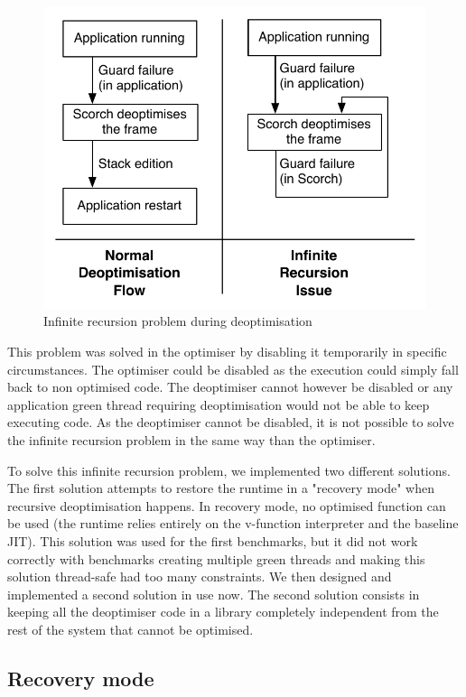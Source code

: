 \documentclass[a4paper,12pt,twoside]{../includes/ThesisStyle}
\begin{document}
\begin{figure}[h!]
    \begin{center}
        \includegraphics[width=0.65\linewidth]{InfiniteRecursionDeoptPb}
        \caption{Infinite recursion problem during deoptimisation}
        \label{fig:InfiniteRecursionDeoptPb}
    \end{center}
\end{figure}

This problem was solved in the optimiser by disabling it temporarily in specific circumstances. The optimiser could be disabled as the execution could simply fall back to non optimised code. The deoptimiser cannot however be disabled or any application green thread requiring deoptimisation would not be able to keep executing code. As the deoptimiser cannot be disabled, it is not possible to solve the infinite recursion problem in the same way than the optimiser. 

To solve this infinite recursion problem, we implemented two different solutions. The first solution attempts to restore the runtime in a "recovery mode" when recursive deoptimisation happens. In recovery mode, no optimised function can be used (the runtime relies entirely on the v-function interpreter and the baseline JIT). This solution was used for the first benchmarks, but it did not work correctly with benchmarks creating multiple green threads and making this solution thread-safe had too many constraints. We then designed and implemented a second solution in use now. The second solution consists in keeping all the deoptimiser code in a library completely independent from the rest of the system that cannot be optimised.

\subsection{Recovery mode}
\end{document}
